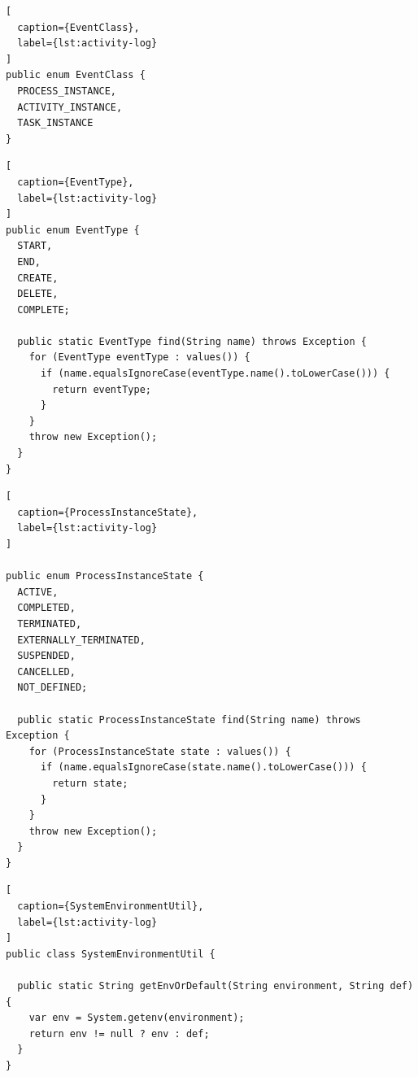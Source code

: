 \begin{lstlisting}[
  caption={EventClass},
  label={lst:activity-log}
]
public enum EventClass {
  PROCESS_INSTANCE,
  ACTIVITY_INSTANCE,
  TASK_INSTANCE
}
\end{lstlisting}

\begin{lstlisting}[
  caption={EventType},
  label={lst:activity-log}
]
public enum EventType {
  START,
  END,
  CREATE,
  DELETE,
  COMPLETE;

  public static EventType find(String name) throws Exception {
    for (EventType eventType : values()) {
      if (name.equalsIgnoreCase(eventType.name().toLowerCase())) {
        return eventType;
      }
    }
    throw new Exception();
  }
}
\end{lstlisting}

\begin{lstlisting}[
  caption={ProcessInstanceState},
  label={lst:activity-log}
]

public enum ProcessInstanceState {
  ACTIVE,
  COMPLETED,
  TERMINATED,
  EXTERNALLY_TERMINATED,
  SUSPENDED,
  CANCELLED,
  NOT_DEFINED;

  public static ProcessInstanceState find(String name) throws Exception {
    for (ProcessInstanceState state : values()) {
      if (name.equalsIgnoreCase(state.name().toLowerCase())) {
        return state;
      }
    }
    throw new Exception();
  }
}
\end{lstlisting}

\begin{lstlisting}[
  caption={SystemEnvironmentUtil},
  label={lst:activity-log}
]
public class SystemEnvironmentUtil {

  public static String getEnvOrDefault(String environment, String def) {
    var env = System.getenv(environment);
    return env != null ? env : def;
  }
}
\end{lstlisting}

